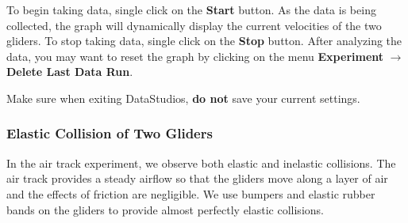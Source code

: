 To begin taking data, single click on the \textbf{Start} button. As the data is being collected, the graph will dynamically display the current velocities of the two gliders. To stop taking data, single click on the \textbf{Stop} button. After analyzing the data, you may want to reset the graph by clicking on the menu \textbf{Experiment} $\rightarrow$ \textbf{Delete Last Data Run}.
\myskip

Make sure when exiting DataStudios, {\bf{do not}} save your current settings.
\subsubsection{Elastic Collision of Two Gliders}\label{sec:elastic}

In the air track experiment, we observe both elastic and inelastic collisions. The air track provides a steady airflow so that the gliders move along a layer of air and the effects of friction are negligible. We use bumpers and elastic rubber bands on the gliders to provide almost perfectly elastic collisions.\myskip


